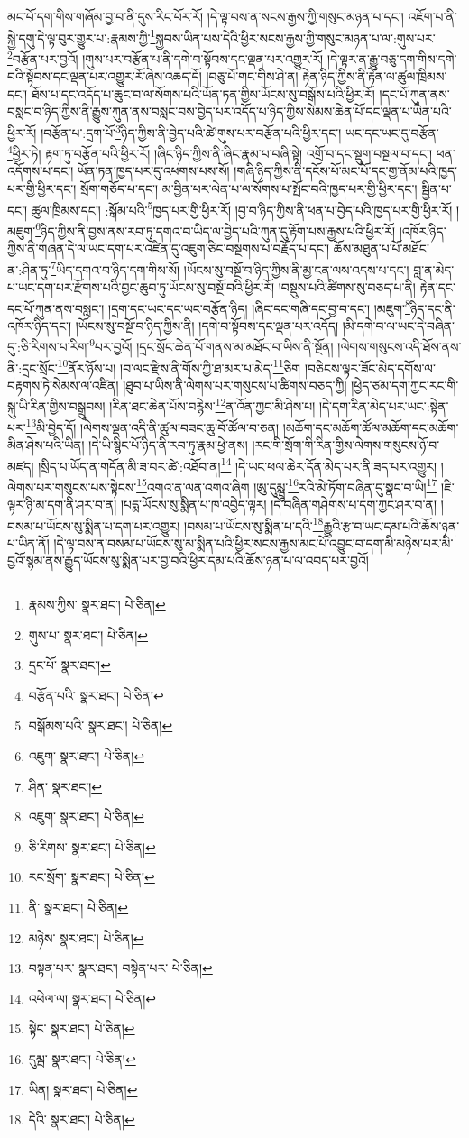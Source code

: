 མང་པོ་དག་གིས་གཞོམ་བྱ་བ་ནི་དུས་རིང་པོར་རོ། །དེ་ལྟ་བས་ན་སངས་རྒྱས་ཀྱི་གསུང་མཉན་པ་དང་། འཇོག་པ་ནི་སྐྱེ་དགུ་དེ་ལྟ་བུར་གྱུར་པ་:རྣམས་ཀྱི་\footnote{རྣམས་ཀྱིས་  སྣར་ཐང་།  པེ་ཅིན། }སྐྱབས་ཡིན་པས་དེའི་ཕྱིར་སངས་རྒྱས་ཀྱི་གསུང་མཉན་པ་ལ་:གུས་པར་\footnote{གུས་པ་  སྣར་ཐང་།  པེ་ཅིན། }བརྩོན་པར་བྱའོ། །གུས་པར་བརྩོན་པ་ནི་དགེ་བ་སྟོབས་དང་ལྡན་པར་འགྱུར་རོ། །དེ་ལྟར་ན་རྒྱུ་བཅུ་དག་གིས་དགེ་བའི་སྟོབས་དང་ལྡན་པར་འགྱུར་རོ་ཞེས་འཆད་དོ། །བཅུ་པོ་གང་གིས་ཤེ་ན། རྟེན་ཉིད་ཀྱིས་ནི་རྟེན་ལ་ཚུལ་ཁྲིམས་དང་། ཐོས་པ་དང་འདོད་པ་ཆུང་བ་ལ་སོགས་པའི་ཡོན་ཏན་གྱིས་ཡོངས་སུ་བསྒོས་པའི་ཕྱིར་རོ། །དང་པོ་ཀུན་ནས་བསླང་བ་ཉིད་ཀྱིས་ནི་རྒྱུས་ཀུན་ནས་བསླང་བས་བྱེད་པར་འདོད་པ་ཉིད་ཀྱིས་སེམས་ཆེན་པོ་དང་ལྡན་པ་ཡིན་པའི་ཕྱིར་རོ། །བརྩོན་པ་:དྲག་པོ་\footnote{དྲང་པོ་  སྣར་ཐང་། }ཉིད་ཀྱིས་ནི་བྱེད་པའི་ཚེ་གུས་པར་བརྩོན་པའི་ཕྱིར་དང་། ཡང་དང་ཡང་དུ་བརྩོན་\footnote{བརྩོན་པའི་  སྣར་ཐང་།  པེ་ཅིན། }ཕྱིར་ཏེ། རྟག་ཏུ་བརྩོན་པའི་ཕྱིར་རོ། །ཞིང་ཉིད་ཀྱིས་ནི་ཞིང་རྣམ་པ་བཞི་སྟེ། འགྲོ་བ་དང་སྡུག་བསྔལ་བ་དང་། ཕན་འདོགས་པ་དང་། ཡོན་ཏན་ཁྱད་པར་དུ་འཕགས་པས་སོ། །གཞི་ཉིད་ཀྱིས་ནི་དངོས་པོ་མང་པོ་དང་གྱ་ནོམ་པའི་ཁྱད་པར་གྱི་ཕྱིར་དང་། སྲོག་གཅོད་པ་དང་། མ་བྱིན་པར་ལེན་པ་ལ་སོགས་པ་སྤོང་བའི་ཁྱད་པར་གྱི་ཕྱིར་དང་། སྦྱིན་པ་དང་། ཚུལ་ཁྲིམས་དང་། :སྒོམ་པའི་\footnote{བསྒོམས་པའི་  སྣར་ཐང་།  པེ་ཅིན། }ཁྱད་པར་གྱི་ཕྱིར་རོ། །བྱ་བ་ཉིད་ཀྱིས་ནི་ཕན་པ་བྱེད་པའི་ཁྱད་པར་གྱི་ཕྱིར་རོ། །མཇུག་\footnote{འཇུག་  སྣར་ཐང་།  པེ་ཅིན། }ཉིད་ཀྱིས་ནི་བྱས་ནས་རབ་ཏུ་དགའ་བ་ཡིད་ལ་བྱེད་པའི་ཀུན་དུ་རྟོག་པས་རྒྱས་པའི་ཕྱིར་རོ། །འཁོར་ཉིད་ཀྱིས་ནི་གཞན་དེ་ལ་ཡང་དག་པར་འཛིན་དུ་འཇུག་ཅིང་བསྔགས་པ་བརྗོད་པ་དང་། ཆོས་མཐུན་པ་པོ་མཐོང་ན་:ཤིན་ཏུ་\footnote{ཤིན་  སྣར་ཐང་། }ཡིད་དགའ་བ་ཉིད་དག་གིས་སོ། །ཡོངས་སུ་བསྔོ་བ་ཉིད་ཀྱིས་ནི་མྱ་ངན་ལས་འདས་པ་དང་། བླ་ན་མེད་པ་ཡང་དག་པར་རྫོགས་པའི་བྱང་ཆུབ་ཏུ་ཡོངས་སུ་བསྔོ་བའི་ཕྱིར་རོ། །བསྡུས་པའི་ཚིགས་སུ་བཅད་པ་ནི། རྟེན་དང་དང་པོ་ཀུན་ནས་བསླང་། །དྲག་དང་ཡང་དང་ཡང་བརྩོན་ཉིད། །ཞིང་དང་གཞི་དང་བྱ་བ་དང་། །མཇུག་\footnote{འཇུག་  སྣར་ཐང་།  པེ་ཅིན། }ཉིད་དང་ནི་འཁོར་ཉིད་དང་། །ཡོངས་སུ་བསྔོ་བ་ཉིད་ཀྱིས་ནི། །དགེ་བ་སྟོབས་དང་ལྡན་པར་འདོད། །མི་དགེ་བ་ལ་ཡང་དེ་བཞིན་དུ་:ཅི་རིགས་པ་རིག་\footnote{ཅི་རིགས་  སྣར་ཐང་།  པེ་ཅིན། }པར་བྱའོ། །དྲང་སྲོང་ཆེན་པོ་གནས་མ་མཐོང་བ་ཡིས་ནི་སྔོན། །ལེགས་གསུངས་འདི་ཐོས་ནས་ནི་:དྲང་སྲོང་\footnote{རང་སྲོག་  སྣར་ཐང་།  པེ་ཅིན། }ནོར་ཉོས་པ། །བ་ལང་རྫིས་ནི་གོས་ཀྱི་ཐ་མར་པ་མེད་\footnote{ནི་  སྣར་ཐང་།  པེ་ཅིན། }ཅིག །བཅིངས་ལྟར་ཟོང་མེད་དགོས་ལ་བརྟགས་ཏེ་སེམས་ལ་འཛིན། །ཐུབ་པ་ཡིས་ནི་ལེགས་པར་གསུངས་པ་ཚིགས་བཅད་ཀྱི། །ཕྱེད་ཙམ་དག་ཀྱང་རང་གི་སྐུ་ཡི་རིན་གྱིས་བསྒྲུབས། །རིན་ཐང་ཆེན་པོས་བརྙེས་\footnote{མཉེས་  སྣར་ཐང་།  པེ་ཅིན། }ན་འོན་ཀྱང་མི་ཤེས་པ། །དེ་དག་རིན་མེད་པར་ཡང་:སྟེན་པར་\footnote{བསྟན་པར་  སྣར་ཐང་། བསྟེན་པར་  པེ་ཅིན། }མི་བྱེད་དོ། །ལེགས་ལྡན་འདི་ནི་ཚུལ་བཟང་ཆུ་བོ་ཚོལ་བ་ཅན། །མཆོག་དང་མཆོག་ཚོལ་མཆོག་དང་མཆོག་མིན་ཤེས་པའི་ཡིན། །དེ་ཡི་སྙིང་པོ་ཉིད་ནི་རབ་ཏུ་རྣམ་ཕྱེ་ནས། །རང་གི་སྲོག་གི་རིན་གྱིས་ལེགས་གསུངས་ཉོ་བ་མཛད། །སྲིད་པ་ཡོད་ན་གདོན་མི་ཟ་བར་ཚེ་:འཐོབ་ན།\footnote{འཕེལ་ལ།  སྣར་ཐང་།  པེ་ཅིན། } །དེ་ཡང་ཕལ་ཆེར་དོན་མེད་པར་ནི་ཟད་པར་འགྱུར། །ལེགས་པར་གསུངས་པས་སྟེངས་\footnote{སྟེང་  སྣར་ཐང་།  པེ་ཅིན། }འགའ་ན་ལན་འགའ་ཞིག །ཨུ་དུམྺཱ་\footnote{དུམྦ་  སྣར་ཐང་།  པེ་ཅིན། }རའི་མེ་ཏོག་བཞིན་དུ་སྣང་བ་ཡི།\footnote{ཡིན།  སྣར་ཐང་།  པེ་ཅིན། } །ཇི་ལྟར་ཉི་མ་དག་ནི་ཤར་བ་ན། །པདྨ་ཡོངས་སུ་སྨིན་པ་ཁ་འབྱེད་ལྟར། །དེ་བཞིན་གཤེགས་པ་དག་ཀྱང་ཤར་བ་ན། །བསམ་པ་ཡོངས་སུ་སྨིན་པ་དག་པར་འགྱུར། །བསམ་པ་ཡོངས་སུ་སྨིན་པ་དའི་\footnote{དེའི་  སྣར་ཐང་།  པེ་ཅིན། }རྒྱུའི་རྩ་བ་ཡང་དམ་པའི་ཆོས་ཉན་པ་ཡིན་ནོ། །དེ་ལྟ་བས་ན་བསམ་པ་ཡོངས་སུ་མ་སྨིན་པའི་ཕྱིར་སངས་རྒྱས་མང་པོ་འབྱུང་བ་དག་མི་མཉེས་པར་མི་བྱའོ་སྙམ་ནས་རྒྱུད་ཡོངས་སུ་སྨིན་པར་བྱ་བའི་ཕྱིར་དམ་པའི་ཆོས་ཉན་པ་ལ་འབད་པར་བྱའོ། 